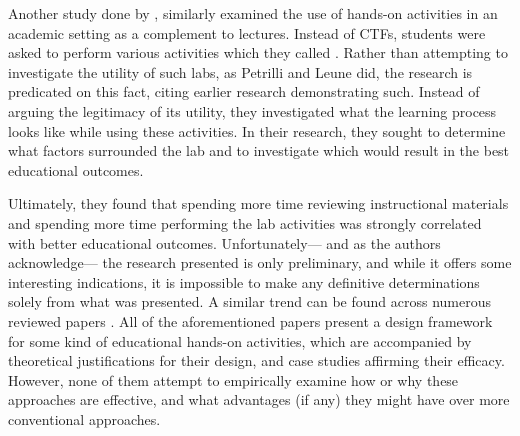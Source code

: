     Another study done by \textcite{Z-Zeng}, similarly examined the use of hands-on activities in an academic setting as a complement to lectures. %
Instead of CTFs, students were asked to perform various activities which they called . %
Rather than attempting to investigate the utility of such labs, as Petrilli and Leune did, the research is predicated on this fact, citing earlier research demonstrating such. %
Instead of arguing the legitimacy of its utility, they investigated what the learning process looks like while using these activities. %
In their research, they sought to determine what factors surrounded the lab and to investigate which would result in the best educational outcomes. 

    Ultimately, they found that spending more time reviewing instructional materials and spending more time performing the lab activities was strongly correlated with better educational outcomes. %
Unfortunately---%
and as the authors acknowledge---%
the research presented is only preliminary, and while it offers some interesting indications, it is impossible to make any definitive determinations solely from what was presented. %
A similar trend can be found across numerous reviewed papers \cite{Y-Deng,W-Du,N-Eliot}. %
All of the aforementioned papers present a design framework for some kind of educational hands-on activities, which are accompanied by theoretical justifications for their design, and case studies affirming their efficacy. %
However, none of them attempt to empirically examine how or why these approaches are effective, and what advantages (if any) they might have over more conventional approaches. 


